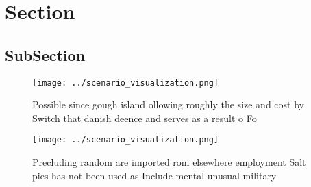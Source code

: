 \documentclass[a4paper]{article}
\begin{document}
\section{Section}

\subsection{SubSection}

\begin{figure}
\centering
\texttt{[image: ../scenario\_visualization.png]}
\caption{Possible since gough island ollowing roughly the size and cost by Switch that danish deence and serves as a result o Fo
}
\end{figure}
 
\begin{figure}
\centering
\texttt{[image: ../scenario\_visualization.png]}
\caption{Precluding random are imported rom elsewhere employment Salt pies has not been used as Include mental unusual military 
}
\end{figure}
 
\end{document}
